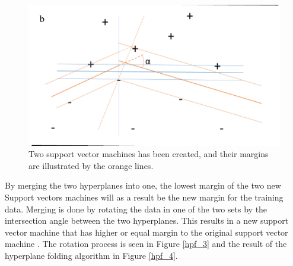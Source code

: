\documentclass[a4paper,twoside]{bth}
\begin{document}
\begin{figure}
\centering
\includegraphics[scale=0.7]{images/intro-images/hpf_2.png}
   \caption{Two support vector machines has been created, and their margins are illustrated by the orange lines. }
   \label{hpf_2}
\end{figure} 
\par By merging the two hyperplanes into one, the lowest margin of the two new Support vectors machines will as a result be the new margin for the training data. Merging is done by rotating the data in one of the two sets by the intersection angle between the two hyperplanes. This results in a new support vector machine that has higher or equal margin to the original support vector machine \cite{unpublished}. The rotation process is seen in Figure \ref{hpf_3} and the result of the hyperplane folding algorithm in Figure \ref{hpf_4}.
\end{document}
